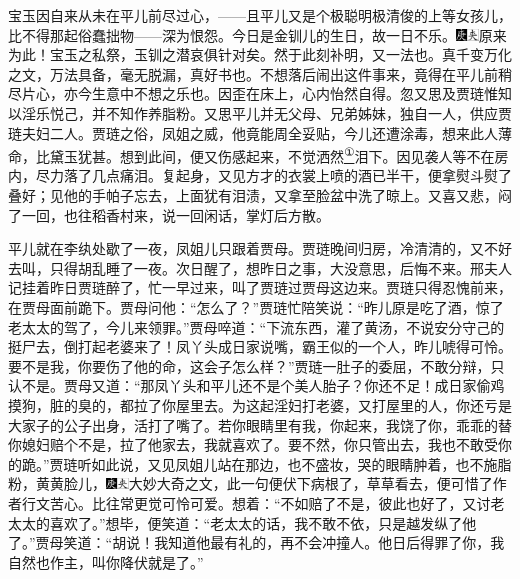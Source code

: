 宝玉因自来从未在平儿前尽过心，------且平儿又是个极聪明极清俊的上等女孩儿，比不得那起俗蠢拙物------深为恨怨。今日是金钏儿的生日，故一日不乐。{\includegraphics[width=3mm]{../Images/00004}\includegraphics[width=3mm]{../Images/00012}\footnotesize \kaishu 原来为此！宝玉之私祭，玉钏之潜哀俱针对矣。然于此刻补明，又一法也。真千变万化之文，万法具备，毫无脱漏，真好书也。}不想落后闹出这件事来，竟得在平儿前稍尽片心，亦今生意中不想之乐也。因歪在床上，心内怡然自得。忽又思及贾琏惟知以淫乐悦己，并不知作养脂粉。又思平儿并无父母、兄弟姊妹，独自一人，供应贾琏夫妇二人。贾琏之俗，凤姐之威，他竟能周全妥贴，今儿还遭涂毒，想来此人薄命，比黛玉犹甚。想到此间，便又伤感起来，不觉洒然\href{../Text/part0048_split_000.html\#lnkback_1_a}{\textsuperscript{①}}泪下。因见袭人等不在房内，尽力落了几点痛泪。复起身，又见方才的衣裳上喷的酒已半干，便拿熨斗熨了叠好；见他的手帕子忘去，上面犹有泪渍，又拿至脸盆中洗了晾上。又喜又悲，闷了一回，也往稻香村来，说一回闲话，掌灯后方散。

平儿就在李纨处歇了一夜，凤姐儿只跟着贾母。贾琏晚间归房，冷清清的，又不好去叫，只得胡乱睡了一夜。次日醒了，想昨日之事，大没意思，后悔不来。邢夫人记挂着昨日贾琏醉了，忙一早过来，叫了贾琏过贾母这边来。贾琏只得忍愧前来，在贾母面前跪下。贾母问他：``怎么了？''贾琏忙陪笑说：``昨儿原是吃了酒，惊了老太太的驾了，今儿来领罪。''贾母啐道：``下流东西，灌了黄汤，不说安分守己的挺尸去，倒打起老婆来了！凤丫头成日家说嘴，霸王似的一个人，昨儿唬得可怜。要不是我，你要伤了他的命，这会子怎么样？''贾琏一肚子的委屈，不敢分辩，只认不是。贾母又道：``那凤丫头和平儿还不是个美人胎子？你还不足！成日家偷鸡摸狗，脏的臭的，都拉了你屋里去。为这起淫妇打老婆，又打屋里的人，你还亏是大家子的公子出身，活打了嘴了。若你眼睛里有我，你起来，我饶了你，乖乖的替你媳妇赔个不是，拉了他家去，我就喜欢了。要不然，你只管出去，我也不敢受你的跪。''贾琏听如此说，又见凤姐儿站在那边，也不盛妆，哭的眼睛肿着，也不施脂粉，黄黄脸儿，{\includegraphics[width=3mm]{../Images/00004}\includegraphics[width=3mm]{../Images/00012}\footnotesize \kaishu 大妙大奇之文，此一句便伏下病根了，草草看去，便可惜了作者行文苦心。}比往常更觉可怜可爱。想着：``不如赔了不是，彼此也好了，又讨老太太的喜欢了。''想毕，便笑道：``老太太的话，我不敢不依，只是越发纵了他了。''贾母笑道：``胡说！我知道他最有礼的，再不会冲撞人。他日后得罪了你，我自然也作主，叫你降伏就是了。''

